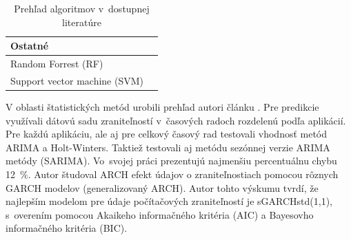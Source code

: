 \documentclass[thesismargins, thesislinespacing, openright, upjsfrontpage]{rnthesis}
\begin{document}
\begin{table}[]
\begin{tabular}{ | p{7cm} | p{7cm} | }
         \hline \multicolumn{2}{l}{\textbf{Ostatné}} \\
         \hline Random Forrest (RF) & \cite{liu2015cloudy} \\
         \hline Support vector machine (SVM) & \cite{liu2015cloudy,hasegawa2001applications,Leau2015,pokhrel2017cybersecurity} \\
         
         
        
         \hline
    \end{tabular}
    \caption{Prehľad algoritmov v~dostupnej literatúre}
    \label{tab:c2_alg}
\end{table}

V oblasti štatistických metód urobili prehľad autori článku \cite{roumani2015time}. Pre predikcie využívali dátovú sadu zraniteľností v~časových radoch rozdelenú podľa aplikácií. Pre každú aplikáciu, ale aj pre celkový časový rad testovali vhodnosť metód ARIMA a Holt-Winters. Taktiež testovali aj metódu sezónnej verzie ARIMA metódy (SARIMA). Vo~svojej práci prezentujú najmenšiu percentuálnu chybu 12~\%. Autor \cite{tang2018disclosure} študoval ARCH efekt údajov o zraniteľnostiach pomocou rôznych GARCH modelov (generalizovaný ARCH). Autor tohto výskumu tvrdí, že najlepším modelom pre údaje počítačových zraniteľností je sGARCHstd(1,1), s~overením pomocou Akaikeho informačného kritéria (AIC) a Bayesovho informačného kritéria (BIC).
\end{document}
